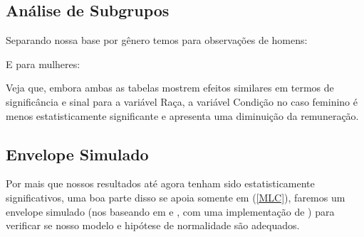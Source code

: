 \documentclass[paper=a4wide, fontsize=10pt]{scrartcl}	 %
\begin{document}
    \subsection{Análise de Subgrupos}

    Separando nossa base por gênero temos para observações de homens:
    
    \begin{table}[H]
        
    \end{table}

    E para mulheres:
    
    \begin{table}[H]
        
    \end{table}

    Veja que, embora ambas as tabelas mostrem efeitos similares em termos de significância e sinal para a variável Raça, a variável Condição no caso feminino é menos estatisticamente significante e apresenta uma diminuição da remuneração.
    
    \subsection{Envelope Simulado}
    Por mais que nossos resultados até agora tenham sido estatisticamente significativos, uma boa parte disso se apoia somente em (\ref{MLC}), faremos um envelope simulado (nos baseando em \cite{f9cc0d93-2781-3c61-a795-5084da4ba2e1} e \cite{Atkinson}, com uma implementação de \cite{Everitt}) para verificar se nosso modelo e hipótese de normalidade são adequados.
\end{document}
